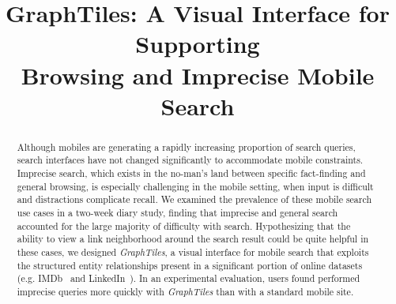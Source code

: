 \documentclass{sigchi}
\begin{document}
\title{GraphTiles: A Visual Interface for Supporting \\Browsing and Imprecise Mobile Search}
%


\maketitle

\toappear

\begin{abstract}
Although mobiles are generating a rapidly increasing proportion of search queries, search interfaces have not changed significantly to accommodate mobile constraints. Imprecise search, which exists in the no-man's land between specific fact-finding and general browsing, is especially challenging in the mobile setting, when input is difficult and distractions complicate recall. We examined the prevalence of these mobile search use cases in a two-week diary study, finding that imprecise and general search accounted for the large majority of difficulty with search. Hypothesizing that the ability to view a link neighborhood around the search result could be quite helpful in these cases, we designed \textit{GraphTiles}, a visual interface for mobile search that exploits the structured entity relationships present in a significant portion of online datasets (e.g. IMDb~\cite{imdb} and LinkedIn~\cite{linkedin}). In an experimental evaluation, users found performed imprecise queries more quickly with \textit{GraphTiles} than with a standard mobile site. 
\end{abstract}
\end{document}
